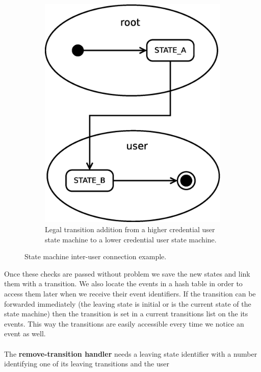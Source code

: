 \begin{figure}[h]
\begin{subfigure}[b]{0.45\textwidth}
    \centering
    \includegraphics[width=\textwidth,keepaspectratio]{img/intersm}
    \caption{Legal transition addition from a higher credential user state machine to a lower credential user state machine.}
    \label{fig:intersm}
  \end{subfigure}
  \caption{State machine inter-user connection example.}
\end{figure}
Once these checks are passed without problem we save the new states and link them with a transition. We also locate the events in a hash
table in order to access them later when we receive their event identifiers. If the transition can be forwarded immediately (the leaving 
state is initial or is the current state of the state machine) then the transition is set in a current transitions list on the its events.
This way the transitions are easily accessible every time we notice an event as well.\\
\\
The {\bf remove-transition handler} needs a leaving state identifier with a number identifying one of its leaving transitions and the user 

